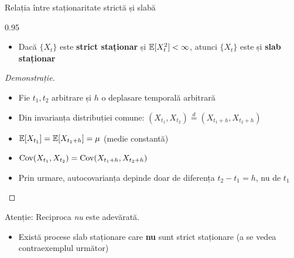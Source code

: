 \documentclass[9pt, aspectratio=169, t]{beamer}
\begin{document}
\begin{frame}{Relația între staționaritate strictă și slabă}
    \begin{cminipage}{0.95\textwidth}
        \vspace{-0.2cm}
        {\footnotesize
        \begin{thm}
            \begin{itemize}\setlength{\itemsep}{0pt}
                \item Dacă $\{X_t\}$ este \textbf{strict staționar} și $\mathbb{E}[X_t^2] < \infty$, atunci $\{X_t\}$ este și \textbf{slab staționar}
            \end{itemize}
        \end{thm}

        \begin{proof}[Demonstrație]
            \begin{itemize}\setlength{\itemsep}{0pt}
                \item Fie $t_1, t_2$ arbitrare și $h$ o deplasare temporală arbitrară
                \item Din invarianța distribuției comune: $(X_{t_1}, X_{t_2}) \stackrel{d}{=} (X_{t_1+h}, X_{t_2+h})$
                \item $\mathbb{E}[X_{t_1}] = \mathbb{E}[X_{t_1+h}] = \mu$ (medie constantă)
                \item $\text{Cov}(X_{t_1}, X_{t_2}) = \text{Cov}(X_{t_1+h}, X_{t_2+h})$
                \item Prin urmare, autocovarianța depinde doar de diferența $t_2 - t_1 = h$, nu de $t_1$
            \end{itemize}
        \end{proof}

        \begin{alertblock}{Atenție: Reciproca \emph{nu} este adevărată.}
            \begin{itemize}\setlength{\itemsep}{0pt}
                \item Există procese slab staționare care \textbf{nu} sunt strict staționare (a se vedea contraexemplul următor)
            \end{itemize}
        \end{alertblock}
        }
    \end{cminipage}
\end{frame}
\end{document}
